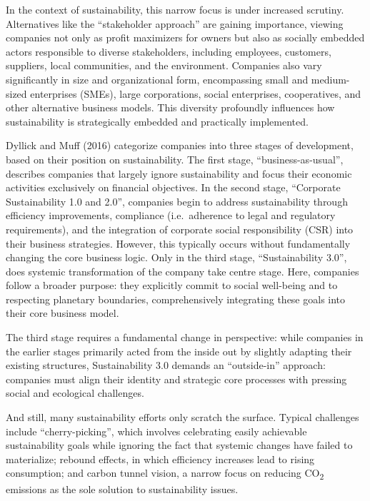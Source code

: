 \documentclass[
  a4paper,
  openany]{book}
\begin{document}
In the context of sustainability, this narrow focus is under increased
scrutiny. Alternatives like the ``stakeholder approach'' are gaining
importance, viewing companies not only as profit maximizers for owners
but also as socially embedded actors responsible to diverse
stakeholders, including employees, customers, suppliers, local
communities, and the environment. Companies also vary significantly in
size and organizational form, encompassing small and medium-sized
enterprises (SMEs), large corporations, social enterprises,
cooperatives, and other alternative business models. This diversity
profoundly influences how sustainability is strategically embedded and
practically implemented.

Dyllick and Muff (2016) categorize companies into three stages of
development, based on their position on sustainability. The first stage,
``business-as-usual'', describes companies that largely ignore
sustainability and focus their economic activities exclusively on
financial objectives. In the second stage, ``Corporate Sustainability
1.0 and 2.0'', companies begin to address sustainability through
efficiency improvements, compliance (i.e.~adherence to legal and
regulatory requirements), and the integration of corporate social
responsibility (CSR) into their business strategies. However, this
typically occurs without fundamentally changing the core business logic.
Only in the third stage, ``Sustainability 3.0'', does systemic
transformation of the company take centre stage. Here, companies follow
a broader purpose: they explicitly commit to social well-being and to
respecting planetary boundaries, comprehensively integrating these goals
into their core business model.

The third stage requires a fundamental change in perspective: while
companies in the earlier stages primarily acted from the inside out by
slightly adapting their existing structures, Sustainability 3.0 demands
an ``outside-in'' approach: companies must align their identity and
strategic core processes with pressing social and ecological challenges.

And still, many sustainability efforts only scratch the surface. Typical
challenges include ``cherry-picking'', which involves celebrating easily
achievable sustainability goals while ignoring the fact that systemic
changes have failed to materialize; rebound effects, in which efficiency
increases lead to rising consumption; and carbon tunnel vision, a narrow
focus on reducing CO\textsubscript{2} emissions as the sole solution to
sustainability issues.
\end{document}

